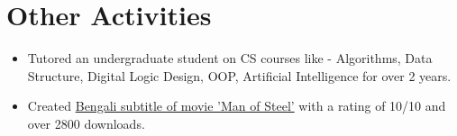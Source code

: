 \documentclass[a4paper,10pt]{article}
\begin{document}
\section{Other Activities}
\begin{itemize}
    \item Tutored an undergraduate student on CS courses like - Algorithms, Data Structure, Digital Logic Design, OOP, Artificial Intelligence for over 2 years.
    
    \item Created \href{https://subscene.com/subtitles/man-of-steel/bengali/805207}{Bengali subtitle of movie 'Man of Steel'} with a rating of 10/10 and over 2800 downloads.
\end{itemize}


\begin{comment}
\section{Research Experience}
\begin{itemize}
    \item \textbf{\textsc{Topic-Relevant Fragment Extraction From Video Tutorials}} \\
    Supervisor : Dr. Anindya Iqbal, Bangladesh University of Engineering and Technology \\
    Focus : Software Engineering, Information retrieval \\
    Summary : The target was to identify the interval when a certain topic was discussed in a very lengthy video. OCR, Speech-to-text were used to identify those intervals. To increase the efficiency of OCR 'Weighted Levenshtein distance' was used. The application was successfully tested with 985 min long \textsc{Youtube} videos.
\end{itemize}

\end{comment}
\end{document}
